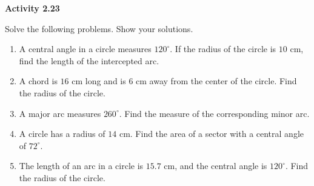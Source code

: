 \vspace{0.3ex}
\noindent\textbf{Activity 2.23}

\vspace{0.2ex}

Solve the following problems. Show your solutions.

\begin{enumerate}
    \item A central angle in a circle measures $120^\circ$. If the radius of the circle is $10$ cm, find the length of the intercepted arc.
    \item A chord is $16$ cm long and is $6$ cm away from the center of the circle. Find the radius of the circle.
    \item A major arc measures $260^\circ$. Find the measure of the corresponding minor arc.
    \item A circle has a radius of $14$ cm. Find the area of a sector with a central angle of $72^\circ$.
    \item The length of an arc in a circle is $15.7$ cm, and the central angle is $120^\circ$. Find the radius of the circle.
\end{enumerate}

